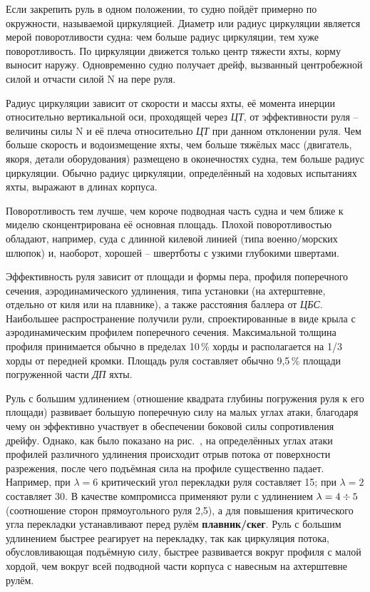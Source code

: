Если закрепить руль в одном положении, то судно пойдёт примерно по
окружности, называемой циркуляцией.  Диаметр или
радиус циркуляции является мерой
поворотливости
судна: чем больше радиус циркуляции, тем хуже поворотливость. По
циркуляции движется только центр тяжести яхты, корму выносит
наружу. Одновременно судно получает дрейф, вызванный центробежной
силой и отчасти силой \ve N на пере руля.

Радиус циркуляции зависит от скорости и массы яхты, её момента инерции
относительно вертикальной оси, проходящей через \textit{ЦТ}, от
эффективности руля \--- величины силы \ve N и её плеча относительно
\textit{ЦТ} при данном отклонении руля. Чем больше скорость и
водоизмещение яхты, чем больше тяжёлых масс (двигатель, якоря, детали
оборудования) размещено в оконечностях судна, тем больше радиус
циркуляции. Обычно радиус циркуляции, определённый на ходовых
испытаниях яхты, выражают в длинах корпуса.

Поворотливость тем лучше, чем короче подводная часть судна и чем ближе
к миделю сконцентрирована её основная площадь. Плохой поворотливостью
обладают, например, суда с длинной килевой линией (типа
военно\-/морских шлюпок) и, наоборот, хорошей \--- швертботы с узкими
глубокими швертами.

Эффективность руля зависит от площади и формы пера, профиля
поперечного сечения, аэродинамического удлинения, типа установки (на
ахтерштевне, отдельно от киля или на плавнике), а также расстояния
баллера от \textit{ЦБС}. Наибольшее распространение получили рули,
спроектированные в виде крыла с аэродинамическим профилем поперечного
сечения. Максимальной толщина профиля принимается обычно в пределах
10\,\% хорды и располагается на 1/3 хорды от передней
кромки. Площадь руля составляет обычно 9,5\,\% площади
погруженной части \textit{ДП} яхты.

Руль с большим удлинением (отношение квадрата глубины погружения руля
к его площади) развивает большую поперечную силу на малых углах атаки,
благодаря чему он эффективно участвует в обеспечении боковой силы
сопротивления дрейфу. Однако, как было показано на рис.~, на
определённых углах атаки профилей различного удлинения происходит
отрыв потока от поверхности разрежения, после чего подъёмная сила на
профиле существенно падает. Например, при $\lambda = 6$ критический
угол перекладки руля составляет 15\gr; при $\lambda = 2$ составляет
30\gr. В качестве компромисса применяют рули с удлинением
$\lambda = 4 \div 5$ (соотношение сторон прямоугольного руля 2,5), а для повышения критического угла перекладки устанавливают перед
рулём \textbf{плавник\-/скег}. Руль с большим удлинением быстрее реагирует на
перекладку, так как циркуляция потока, обусловливающая подъёмную силу,
быстрее развивается вокруг профиля с малой хордой, чем вокруг всей
подводной части корпуса с навесным на ахтерштевне рулём.

